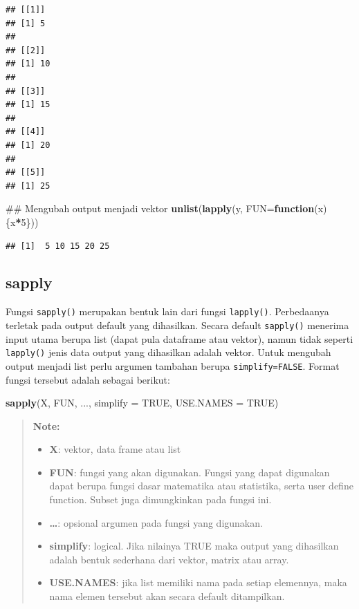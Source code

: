 \documentclass[]{book}
\newenvironment{Shaded}{\begin{snugshade}}{\end{snugshade}}
\newcommand{\KeywordTok}[1]{\textcolor[rgb]{0.13,0.29,0.53}{\textbf{#1}}}
\newcommand{\DataTypeTok}[1]{\textcolor[rgb]{0.13,0.29,0.53}{#1}}
\newcommand{\DecValTok}[1]{\textcolor[rgb]{0.00,0.00,0.81}{#1}}
\newcommand{\OtherTok}[1]{\textcolor[rgb]{0.56,0.35,0.01}{#1}}
\newcommand{\ControlFlowTok}[1]{\textcolor[rgb]{0.13,0.29,0.53}{\textbf{#1}}}
\newcommand{\OperatorTok}[1]{\textcolor[rgb]{0.81,0.36,0.00}{\textbf{#1}}}
\newcommand{\NormalTok}[1]{#1}
\providecommand{\tightlist}{%
  \setlength{\itemsep}{0pt}\setlength{\parskip}{0pt}}
\begin{document}
\begin{verbatim}
## [[1]]
## [1] 5
## 
## [[2]]
## [1] 10
## 
## [[3]]
## [1] 15
## 
## [[4]]
## [1] 20
## 
## [[5]]
## [1] 25
\end{verbatim}

\begin{Shaded}
\begin{Highlighting}[]
\NormalTok{## Mengubah output menjadi vektor}
\KeywordTok{unlist}\NormalTok{(}\KeywordTok{lapply}\NormalTok{(y, }\DataTypeTok{FUN=}\ControlFlowTok{function}\NormalTok{(x)\{x}\OperatorTok{*}\DecValTok{5}\NormalTok{\}))}
\end{Highlighting}
\end{Shaded}

\begin{verbatim}
## [1]  5 10 15 20 25
\end{verbatim}

\subsection{sapply}\label{sapply}

Fungsi \texttt{sapply()} merupakan bentuk lain dari fungsi
\texttt{lapply()}. Perbedaanya terletak pada output default yang
dihasilkan. Secara default \texttt{sapply()} menerima input utama berupa
list (dapat pula dataframe atau vektor), namun tidak seperti
\texttt{lapply()} jenis data output yang dihasilkan adalah vektor. Untuk
mengubah output menjadi list perlu argumen tambahan berupa
\texttt{simplify=FALSE}. Format fungsi tersebut adalah sebagai berikut:

\begin{Shaded}
\begin{Highlighting}[]
\KeywordTok{sapply}\NormalTok{(X, FUN, ..., }\DataTypeTok{simplify =} \OtherTok{TRUE}\NormalTok{, }\DataTypeTok{USE.NAMES =} \OtherTok{TRUE}\NormalTok{)}
\end{Highlighting}
\end{Shaded}

\begin{quote}
\textbf{Note: }

\begin{itemize}
\tightlist
\item
  \textbf{X}: vektor, data frame atau list
\item
  \textbf{FUN}: fungsi yang akan digunakan. Fungsi yang dapat digunakan
  dapat berupa fungsi dasar matematika atau statistika, serta user
  define function. Subset juga dimungkinkan pada fungsi ini.
\item
  \textbf{\ldots{}}: opsional argumen pada fungsi yang digunakan.
\item
  \textbf{simplify}: logical. Jika nilainya TRUE maka output yang
  dihasilkan adalah bentuk sederhana dari vektor, matrix atau array.
\item
  \textbf{USE.NAMES}: jika list memiliki nama pada setiap elemennya,
  maka nama elemen tersebut akan secara default ditampilkan.
\end{itemize}
\end{quote}
\end{document}
